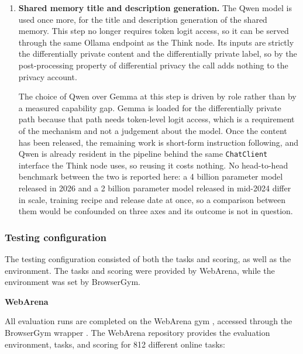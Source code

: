 \begin{enumerate}
    The model is loaded in \texttt{torch.bfloat16} rather than fp32 or fp16.
    Gemma 2 applies logit soft-capping in each attention layer and in the final
    layer \citep{gemmateam2024gemma2}, and fp16's narrower exponent range
    produces silent NaN and Inf values there, while fp32 was too slow on MPS.
    bfloat16 is the model's training dtype and preserves the fp32 dynamic range
    at roughly half the per-forward cost.

    \item \textbf{Shared memory title and description generation.} The Qwen
    model is used once more, for the title and description generation of the
    shared memory. This step no longer requires token logit access, so it can
    be served through the same Ollama endpoint as the Think node. Its inputs
    are strictly the differentially private content and the differentially
    private label, so by the post-processing property of differential privacy
    the call adds nothing to the privacy account.

    The choice of Qwen over Gemma at this step is driven by role rather than by
    a measured capability gap. Gemma is loaded for the differentially private
    path because that path needs token-level logit access, which is a
    requirement of the mechanism and not a judgement about the model. Once the
    content has been released, the remaining work is short-form instruction
    following, and Qwen is already resident in the pipeline behind the same
    \texttt{ChatClient} interface the Think node uses, so reusing it costs
    nothing. No head-to-head benchmark between the two is reported here: a 4
    billion parameter model released in 2026 and a 2 billion parameter model
    released in mid-2024 differ in scale, training recipe and release date at
    once, so a comparison between them would be confounded on three axes and
    its outcome is not in question.
\end{enumerate}

\subsubsection{Testing configuration}
The testing configuration consisted of both the tasks and scoring, as well as the environment. The tasks and scoring were provided by WebArena, while the environment was set by BrowserGym.

\textbf{WebArena}

All evaluation runs are completed on the WebArena gym \citep{zhou2024webarena},
accessed through the BrowserGym wrapper \citep{dechezelles2024browsergym}. The
WebArena repository provides the evaluation environment, tasks, and scoring for
812 different online tasks:

